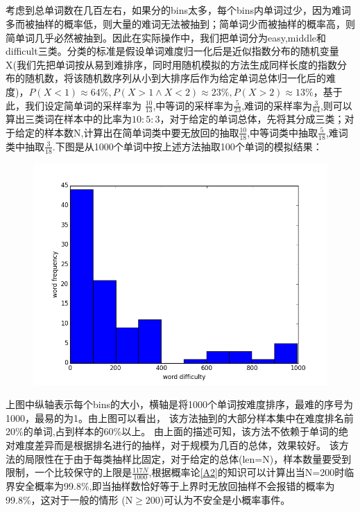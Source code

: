 \documentclass[12pt]{article}
\begin{document}
\subsection{\textbf{}}
考虑到总单词数在几百左右，如果分的bins太多，每个bins内单词过少，因为难词多而被抽样的概率低，则大量的难词无法被抽到；简单词少而被抽样的概率高，则简单词几乎必然被抽到。因此在实际操作中，我们把单词分为easy,middle和difficult三类。分类的标准是假设单词难度归一化后是近似指数分布的随机变量X(我们先把单词按从易到难排序，同时用随机模拟的方法生成同样长度的指数分布的随机数，将该随机数序列从小到大排序后作为给定单词总体归一化后的难度)，$P(X<1)\approx 64\%,P(X>1 \wedge X<2) \approx 23\%,P(X>2) \approx 13\%$，基于此，我们设定简单词的采样率为
$\frac{10}{13}$,中等词的采样率为$\frac{5}{23}$,难词的采样率为$\frac{3}{64}$,则可以算出三类词在样本中的比率为$10:5:3$，对于给定的单词总体，先将其分成三类；对于给定的样本数N,计算出在简单词类中要无放回的抽取$\frac{10}{18}$,中等词类中抽取$\frac{5}{18}$,难词类中抽取$\frac{3}{18}$.下图是从1000个单词中按上述方法抽取100个单词的模拟结果：
\begin{figure}[!ht]
\includegraphics[width=\linewidth]{sampling.png}
\end{figure}

上图中纵轴表示每个bins的大小，横轴是将1000个单词按难度排序，最难的序号为1000，最易的为1。由上图可以看出，
该方法抽到的大部分样本集中在难度排名前20\%的单词,占到样本的60\%以上。
由上面的描述可知，该方法不依赖于单词的绝对难度差异而是根据排名进行的抽样，对于规模为几百的总体，效果较好。
该方法的局限性在于由于每类抽样比固定，对于给定的总体(len=N)，样本数量要受到限制，一个比较保守的上限是$\frac{117N}{1000}$,根据概率论\ref{A2}的知识可以计算出当N=200时临界安全概率为99.8\%,即当抽样数恰好等于上界时无放回抽样不会报错的概率为99.8\%，这对于一般的情形
(N$\geq 200$)可认为不安全是小概率事件。
\end{document}
